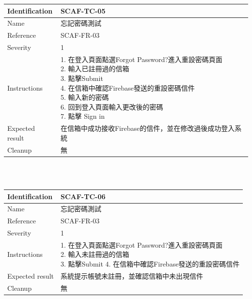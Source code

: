 \documentclass{report}
\begin{document}
\begin{tabularx}{\textwidth}{
  |p{}%
  |p{}|%
  }
  \hline
  \centering Identification &  SCAF-TC-05 \\
  \hline
  \centering Name & 忘記密碼測試 \\
  \hline
  \centering Reference & SCAF-FR-03 \\
  \hline
  \centering Severity & 1 \\
  \hline
  \centering Instructions & 
  \makecell[l]{
    1. 在登入頁面點選Forgot Password?進入重設密碼頁面 \\
    2. 輸入已註冊過的信箱  \\
    3. 點擊Submit \\
    4. 在信箱中確認Firebase發送的重設密碼信件 \\
    5. 輸入新的密碼 \\
    6. 回到登入頁面輸入更改後的密碼  \\
    7. 點擊 Sign in
  }\\
  \hline
  \centering Expected result & 在信箱中成功接收Firebase的信件，並在修改過後成功登入系統 \\
  \hline
  \centering Cleanup & 無 \\
  \hline
\end{tabularx}
\\
\newline
\\
\begin{tabularx}{\textwidth}{
  |p{}%
  |p{}|%
  }
  \hline
  \centering Identification &  SCAF-TC-06 \\
  \hline
  \centering Name & 忘記密碼測試 \\
  \hline
  \centering Reference & SCAF-FR-03 \\
  \hline
  \centering Severity & 1 \\
  \hline
  \centering Instructions & 
  \makecell[l]{
    1. 在登入頁面點選Forgot Password?進入重設密碼頁面 \\
    2. 輸入未註冊過的信箱  \\
    3. 點擊Submit
    4. 在信箱中確認Firebase發送的重設密碼信件
  }\\
  \hline
  \centering Expected result & 系統提示帳號未註冊，並確認信箱中未出現信件 \\
  \hline
  \centering Cleanup & 無 \\
  \hline
\end{tabularx}
\end{document}
